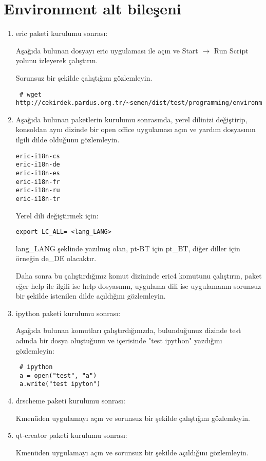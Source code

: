 \documentclass[a4paper,10pt]{article}
\begin{document}
\section{Environment alt bileşeni}
\begin{enumerate}
 \item eric paketi kurulumu sonrası:
 
Aşağıda bulunan dosyayı eric uygulaması ile açın ve Start $\rightarrow$ Run Script yolunu izleyerek çalıştırın. 

Sorunsuz bir şekilde çalıştığını gözlemleyin.
\begin{verbatim}
 # wget http://cekirdek.pardus.org.tr/~semen/dist/test/programming/environment/test.py
\end{verbatim}
 \item Aşağıda bulunan paketlerin kurulumu sonrasında, yerel dilinizi değiştirip, konsoldan aynı dizinde bir open office uygulaması açın ve yardım dosyasının ilgili dilde olduğunu gözlemleyin.
\begin{verbatim}
eric-i18n-cs
eric-i18n-de
eric-i18n-es
eric-i18n-fr
eric-i18n-ru
eric-i18n-tr
 \end{verbatim}

Yerel dili değiştirmek için:
\begin{verbatim}
export LC_ALL= <lang_LANG>
\end{verbatim}

lang\_LANG şeklinde yazılmış olan, pt-BT için pt\_BT, diğer diller için örneğin de\_DE olacaktır.

Daha sonra bu çalıştırdığınız komut dizininde eric4 komutunu çalıştırın, paket eğer help ile ilgili ise help dosyasının, uygulama dili ise uygulamanın sorunsuz bir şekilde istenilen dilde açıldığını gözlemleyin.

\item ipython paketi kurulumu sonrası: 

Aşağıda bulunan komutları çalıştırdığınızda, bulunduğunuz dizinde test adında bir dosya oluştuğunu ve içerisinde "test ipython" yazdığını gözlemleyin:
\begin{verbatim}
 # ipython
 a = open("test", "a")
 a.write("test ipyton")
\end{verbatim}

\item drscheme paketi kurulumu sonrası:

Kmenüden uygulamayı açın ve sorunsuz bir şekilde çalıştığını gözlemleyin.

\item qt-creator paketi kurulumu sonrası:

Kmenüden uygulamayı açın ve sorunsuz bir şekilde açıldığını gözlemleyin.
\end{enumerate}
\end{document}
